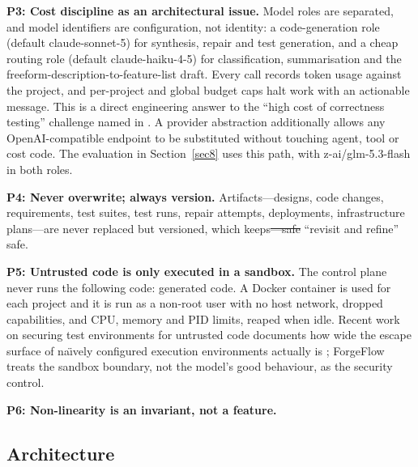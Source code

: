 \documentclass[pdflatex,sn-mathphys-num]{sn-jnl}%
\newcommand{\fix}[1]{{\color{fixcol}#1}}
\newcommand{\fixdel}[1]{{\color{fixcol}\sout{#1}}}
\newcommand{\rw}[2]{{\color{rwcol}#1}}%
\theoremstyle{thmstyleone}%
\theoremstyle{thmstyletwo}%
\theoremstyle{thmstylethree}%
\begin{document}
\rw{\textbf{P3: Cost discipline as an architectural issue.}}{\textbf{P3: Cost discipline as an architectural concern.}} Model roles are separated, and model identifiers are configuration, not identity: a code-generation role (default claude-sonnet-5) for synthesis, repair and test generation, and a cheap routing role (default claude-haiku-4-5) for classification, summarisation and the freeform-description-to-feature-list draft. Every call records token usage against the project, and per-project and global budget caps halt work with an actionable message. This is a direct engineering answer to the ``high cost of correctness testing'' challenge named in \cite{r22pasuksmit}. A provider abstraction additionally allows any OpenAI-compatible endpoint to be substituted without touching agent, tool or cost code. The evaluation in Section~\ref{sec8} uses this path, with z-ai/glm-5.3-flash in both roles.

\textbf{P4: Never overwrite; always version.} \rw{Artifacts---designs, code changes, requirements, test suites, test runs, repair attempts, deployments, infrastructure plans---are never replaced\fix{ but} versioned\fix{, which keeps}\fixdel{---safe} ``revisit and refine''\fix{ safe}.}{Artifacts---designs, code changes, requirements, test suites, test runs, repair attempts, deployments, infrastructure plans---are versioned, never replaced, which is what makes ``revisit and refine'' safe.}

\rw{\textbf{P5: Untrusted code is only executed in a sandbox.} The control plane never runs the following code: generated code. A Docker container is used for each project and it is run as a non-root user with no host network, dropped capabilities, and CPU, memory and PID limits, reaped when idle.}{\textbf{P5: Untrusted code runs only in sandboxes.} The control plane never executes generated code. Each project receives a Docker container running as a non-root user with no host network, dropped capabilities, and CPU, memory and PID limits, reaped when idle.} Recent work on securing test environments for untrusted code documents how wide the escape surface of na\"{\i}vely configured execution environments actually is \cite{r24rabin}; ForgeFlow treats the sandbox boundary, not the model's good behaviour, as the security control.

\textbf{P6: Non-linearity is an invariant, not a feature.}

\subsection{Architecture}\label{sec3.2}
\end{document}
